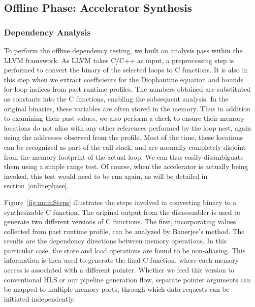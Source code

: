 \subsection{Offline Phase: Accelerator Synthesis}

\subsubsection{Dependency Analysis}
To perform the offline dependency testing, we built an analysis pass within the LLVM framework. As LLVM takes C/C++ as input, a preprocessing step is performed
to convert the binary of the selected loops to C functions. It is also in this step when we extract coefficients for the Diophantine equation and bounds for loop indices from past runtime profiles.
The numbers obtained are substituted as constants into the C functions, enabling the subsequent analysis. 
In the original binaries, these variables are often stored in the memory. 
Thus in addition to examining their past values, we also perform a check to ensure their memory locations do not alias with any other references performed by the loop nest, again using the addresses observed from the profile. Most of the time, these locations can be
recognized as part of the call stack, and are normally completely disjoint from
the memory footprint of the actual loop. We can thus easily disambiguate them using a simple
range test. Of course, when the accelerator is actually being invoked, this test would need to be run again, as will be detailed in section~\ref{onlinephase}.
 
Figure~\ref{fig:mainSteps} illustrates the steps involved in converting binary to a synthesizable C function. 
The original output from the disassembler is used to generate two
different versions of C functions. The first, incorporating values collected from past runtime profile, can be analyzed by Banerjee's method. The results are the dependency directions between memory operations. In this particular case, the store and load operations are found to be non-aliasing. This information is then used to generate the final C function, where each memory access is associated with a different pointer. Whether we
feed this version to conventional HLS or our pipeline generation flow, separate pointer
arguments can be mapped to multiple memory ports, through which data requests can be initiated
independently.

